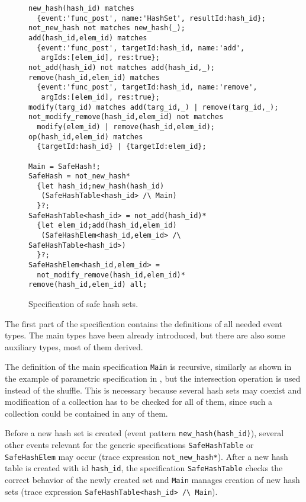 \begin{figure}[h]
\begin{lstlisting}[basicstyle=\ttfamily\scriptsize]
new_hash(hash_id) matches
  {event:'func_post', name:'HashSet', resultId:hash_id};
not_new_hash not matches new_hash(_);
add(hash_id,elem_id) matches
  {event:'func_post', targetId:hash_id, name:'add',
   argIds:[elem_id], res:true};
not_add(hash_id) not matches add(hash_id,_);
remove(hash_id,elem_id) matches
  {event:'func_post', targetId:hash_id, name:'remove',
   argIds:[elem_id], res:true};
modify(targ_id) matches add(targ_id,_) | remove(targ_id,_);
not_modify_remove(hash_id,elem_id) not matches
  modify(elem_id) | remove(hash_id,elem_id);
op(hash_id,elem_id) matches
  {targetId:hash_id} | {targetId:elem_id};

Main = SafeHash!;  
SafeHash = not_new_hash*
  {let hash_id;new_hash(hash_id)
   (SafeHashTable<hash_id> /\ Main)
  }?;
SafeHashTable<hash_id> = not_add(hash_id)*
  {let elem_id;add(hash_id,elem_id)
   (SafeHashElem<hash_id,elem_id> /\ SafeHashTable<hash_id>)
  }?;
SafeHashElem<hash_id,elem_id> = 
  not_modify_remove(hash_id,elem_id)* remove(hash_id,elem_id) all;
\end{lstlisting}
\caption{Specification of safe hash sets.}\label{list:hash}
\end{figure}

The first part of the specification contains the definitions of all needed event types. The main types have been already introduced,
but there are also some auxiliary types, most of them derived.

The definition of the main specification \lstinline{Main} is recursive, similarly as shown in the example of parametric specification in
, but the intersection operation is used instead of the shuffle. This is necessary because several hash sets may
coexist and modification of a collection has to be checked for all of them, since such a collection could be contained in any of them.

Before a new hash set is created (event pattern \lstinline{new_hash(hash_id)}), several other events relevant for the generic specifications \lstinline{SafeHashTable} or  \lstinline{SafeHashElem} may occur (trace expression \lstinline{not_new_hash*}).
After a new hash table is created with id \lstinline{hash_id}, the specification \lstinline{SafeHashTable} checks the correct behavior of
the newly created set and \lstinline{Main} manages creation of new hash sets (trace expression \lstinline{SafeHashTable<hash_id> /\ Main}).

